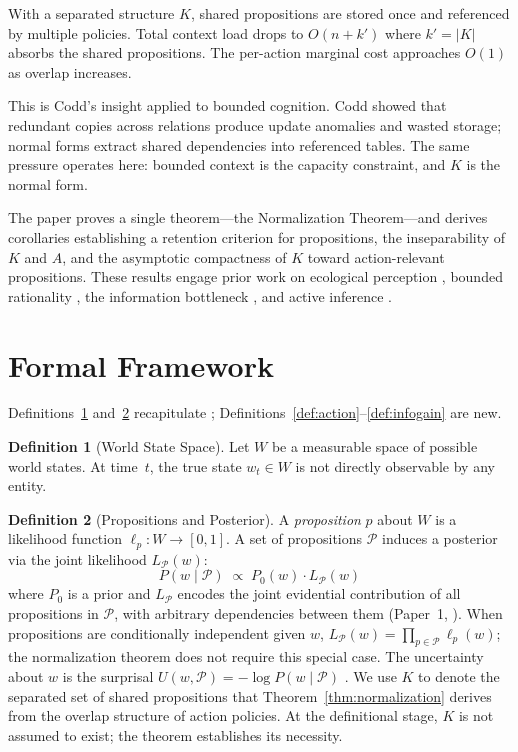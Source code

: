 \documentclass[11pt]{article}
\theoremstyle{definition}
\newtheorem{definition}{Definition}
\theoremstyle{remark}
\begin{document}
With a separated structure $K$, shared propositions are stored once and
referenced by multiple policies. Total context load drops to
$O(n + k')$ where $k' = |K|$ absorbs the shared propositions. The
per-action marginal cost approaches $O(1)$ as overlap increases.

This is Codd's insight \cite{Codd1970} applied to bounded cognition.
Codd showed that redundant copies across relations produce update
anomalies and wasted storage; normal forms extract shared dependencies
into referenced tables. The same pressure operates here: bounded
context is the capacity constraint, and $K$ is the normal form.

The paper proves a single theorem---the Normalization Theorem---and
derives corollaries establishing a retention criterion for propositions,
the inseparability of $K$ and $A$, and the asymptotic compactness of $K$
toward action-relevant propositions. These results engage prior work on
ecological perception \cite{Gibson1979}, bounded rationality
\cite{Simon1955}, the information bottleneck \cite{Tishby2000,
Tishby2011}, and active inference \cite{Friston2010,
ParrPezzuloFriston2022}.

\section{Formal Framework}
\label{sec:framework}

Definitions~\ref{def:world} and~\ref{def:knowledge} recapitulate
\cite{McCarthy2026a}; Definitions~\ref{def:action}--\ref{def:infogain}
are new.

\begin{definition}[World State Space]
\label{def:world}
Let $W$ be a measurable space of possible world states. At time~$t$, the
true state $w_t \in W$ is not directly observable by any entity.
\end{definition}

\begin{definition}[Propositions and Posterior]
\label{def:knowledge}
A \emph{proposition} $p$ about $W$ is a likelihood function
$\ell_p : W \to [0,1]$. A set of propositions $\mathcal{P}$ induces a
posterior via the joint likelihood $L_{\mathcal{P}}(w)$:
\[
P(w \mid \mathcal{P}) \;\propto\; P_0(w) \cdot L_{\mathcal{P}}(w)
\]
where $P_0$ is a prior and $L_{\mathcal{P}}$ encodes the joint
evidential contribution of all propositions in $\mathcal{P}$, with
arbitrary dependencies between them (Paper~1, \cite{McCarthy2026a}).
When propositions are conditionally independent given $w$,
$L_{\mathcal{P}}(w) = \prod_{p \in \mathcal{P}} \ell_p(w)$; the
normalization theorem does not require this special case. The uncertainty about $w$ is the surprisal
$U(w, \mathcal{P}) = -\log P(w \mid \mathcal{P})$ \cite{Shannon1948, Cover2006}.
We use $K$ to denote the separated set of shared propositions that
Theorem~\ref{thm:normalization} derives from the overlap structure of
action policies. At the definitional stage, $K$ is not assumed to
exist; the theorem establishes its necessity.
\end{definition}
\end{document}
